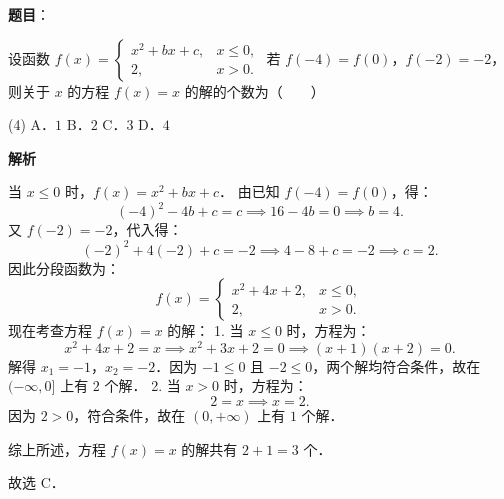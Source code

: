 \begin{answer}

\textbf{题目}：

设函数 $f(x) = \begin{cases} x^2 + bx + c, & x \leqslant 0, \\ 2, & x > 0. \end{cases}$ 若 $f(-4) = f(0)$，$f(-2) = -2$，则关于 $x$ 的方程 $f(x) = x$ 的解的个数为\mbox{（　　）}

\begin{gkopts}(4)
\task A．$1$
\task B．$2$
\task C．$3$
\task D．$4$
\end{gkopts}

\textbf{解析}

当 $x \leqslant 0$ 时，$f(x) = x^2 + bx + c$．
由已知 $f(-4) = f(0)$，得：
\nopagebreak[4]
\[
(-4)^2 - 4b + c = c \implies 16 - 4b = 0 \implies b = 4.
\]
又 $f(-2) = -2$，代入得：
\nopagebreak[4]
\[
(-2)^2 + 4(-2) + c = -2 \implies 4 - 8 + c = -2 \implies c = 2.
\]
因此分段函数为：
\nopagebreak[4]
\[
f(x) = \begin{cases} x^2 + 4x + 2, & x \leqslant 0, \\ 2, & x > 0. \end{cases}
\]
现在考查方程 $f(x) = x$ 的解：
1. 当 $x \leqslant 0$ 时，方程为：
\nopagebreak[4]
\[
x^2 + 4x + 2 = x \implies x^2 + 3x + 2 = 0 \implies (x + 1)(x + 2) = 0.
\]
解得 $x_1 = -1$，$x_2 = -2$．因为 $-1 \leqslant 0$ 且 $-2 \leqslant 0$，两个解均符合条件，故在 $(-\infty, 0]$ 上有 $2$ 个解．
2. 当 $x > 0$ 时，方程为：
\nopagebreak[4]
\[
2 = x \implies x = 2.
\]
因为 $2 > 0$，符合条件，故在 $(0, +\infty)$ 上有 $1$ 个解．

综上所述，方程 $f(x) = x$ 的解共有 $2 + 1 = 3$ 个．

故选 C．


\end{answer}
